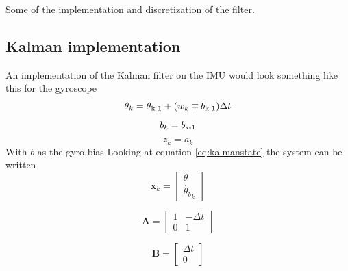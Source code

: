 \documentclass[a4paper,11pt]{kth-mag}
\begin{document}
Some of the implementation and discretization of the filter.
\subsection{Kalman implementation}
An implementation of the Kalman filter on the IMU would look something like this for the gyroscope
\begin{equation}
\theta_k = \theta \textsubscript{k-1} + (w_k \mp b\textsubscript{k-1}) \Delta t
\end{equation}
\begin{equation}
b_k = b\textsubscript{k-1}
\end{equation}
\begin{equation}
z_k = a_k
\end{equation}
With $b$ as the gyro bias
Looking at equation \eqref{eq:kalmanstate} the system can be written
\begin{equation}
\textbf{x}_k = \begin{bmatrix}
\theta \\
\dot{\theta_b}_k
\end{bmatrix}
\end{equation}

\begin{equation}
\textbf{A} = \begin{bmatrix}
1  & -\Delta t \\
0   & 1
\end{bmatrix}
\end{equation}

\begin{equation}
\textbf{B} = \begin{bmatrix}
\Delta t \\ 0
\end{bmatrix}
\end{equation}
\end{document}
